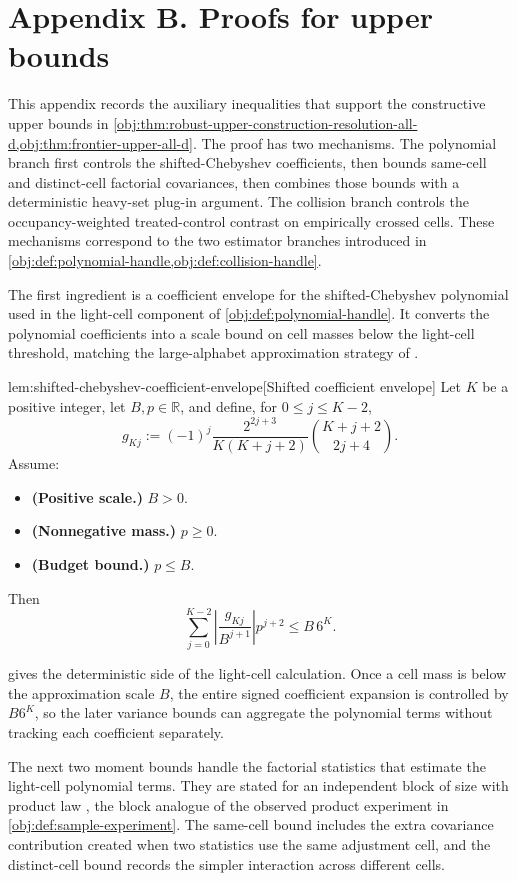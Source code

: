 \section{Appendix B. Proofs for upper bounds}

This appendix records the auxiliary inequalities that support the constructive upper bounds in \cref{obj:thm:robust-upper-construction-resolution-all-d,obj:thm:frontier-upper-all-d}. The proof has two mechanisms. The polynomial branch first controls the shifted-Chebyshev coefficients, then bounds same-cell and distinct-cell factorial covariances, then combines those bounds with a deterministic heavy-set plug-in argument. The collision branch controls the occupancy-weighted treated-control contrast on empirically crossed cells. These mechanisms correspond to the two estimator branches introduced in \cref{obj:def:polynomial-handle,obj:def:collision-handle}.

The first ingredient is a coefficient envelope for the shifted-Chebyshev polynomial used in the light-cell component of \cref{obj:def:polynomial-handle}. It converts the polynomial coefficients into a scale bound on cell masses below the light-cell threshold, matching the large-alphabet approximation strategy of \citet{JiaoVenkatHanWeissman2015,WuYang2016Entropy}.

\begin{lemmav}{lem:shifted-chebyshev-coefficient-envelope}[Shifted coefficient envelope]
Let \(K\) be a positive integer, let \(B,p\in\mathbb R\), and define, for \(0\le j\le K-2\),
\[
g_{Kj}
:=
(-1)^j
\frac{2^{2j+3}}{K(K+j+2)}
\binom{K+j+2}{2j+4}.
\]
Assume:
\begin{itemize}
\item \textbf{(Positive scale.)} \(B>0\).
\item \textbf{(Nonnegative mass.)} \(p\ge 0\).
\item \textbf{(Budget bound.)} \(p\le B\).
\end{itemize}
Then
\[
\sum_{j=0}^{K-2}
\left|\frac{g_{Kj}}{B^{j+1}}\right|p^{j+2}
\le
B\,6^K.
\]
\end{lemmav}

 gives the deterministic side of the light-cell calculation. Once a cell mass is below the approximation scale \(B\), the entire signed coefficient expansion is controlled by \(B6^K\), so the later variance bounds can aggregate the polynomial terms without tracking each coefficient separately.

The next two moment bounds handle the factorial statistics that estimate the light-cell polynomial terms. They are stated for an independent block of size  with product law , the block analogue of the observed product experiment in \cref{obj:def:sample-experiment}. The same-cell bound includes the extra covariance contribution created when two statistics use the same adjustment cell, and the distinct-cell bound records the simpler interaction across different cells.

